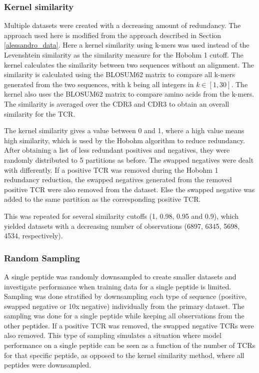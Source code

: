 \subsubsection{Kernel similarity} \label{kernel_sim}
Multiple datasets were created with a decreasing amount of redundancy. The approach used here is modified from the approach described in Section \ref{alessandro_data}. Here a kernel similarity using k-mers \cite{Shen2012TowardsChains} was used instead of the Levenshtein similarity as the similarity measure for the Hobohm 1 cutoff. The kernel calculates the similarity between two sequences without an alignment. The similarity is calculated using the BLOSUM62 matrix to compare all k-mers generated from the two sequences, with k being all integers in $k\in[1, 30]$. The kernel also uses the BLOSUM62 matrix to compare amino acids from the k-mers. The similarity is averaged over the CDR3{\textalpha} and CDR3{\textbeta} to obtain an overall similarity for the TCR. 

The kernel similarity gives a value between 0 and 1, where a high value means high similarity, which is used by the Hobohm algorithm to reduce redundancy. After obtaining a list of less redundant positives and negatives, they were randomly distributed to 5 partitions as before. The swapped negatives were dealt with differently. If a positive TCR was removed during the Hobohm 1 redundancy reduction, the swapped negatives generated from the removed positive TCR were also removed from the dataset. Else the swapped negative was added to the same partition as the corresponding positive TCR.

This was repeated for several similarity cutoffs (1, 0.98, 0.95 and 0.9), which yielded datasets with a decreasing number of observations (6897, 6345, 5698, 4534, respectively).
\subsubsection{Random Sampling} \label{subsample}
A single peptide was randomly downsampled to create smaller datasets and investigate performance when training data for a single peptide is limited. Sampling was done stratified by downsampling each type of sequence (positive, swapped negative or 10x negative) individually from the primary dataset. The sampling was done for a single peptide while keeping all observations from the other peptides. If a positive TCR was removed, the swapped negative TCRs were also removed. This type of sampling simulates a situation where model performance on a single peptide can be seen as a function of the number of TCRs for that specific peptide, as opposed to the kernel similarity method, where all peptides were downsampled.

